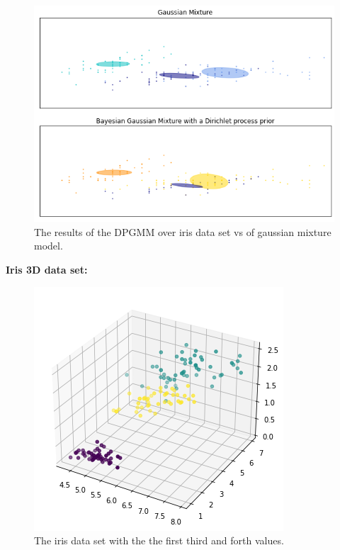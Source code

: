 \documentclass[12pt, a4paper]{paper}
\begin{document}
\begin{figure}[h!]
\centering
\includegraphics[scale=0.6]{iris_DPGMM_init.png}
\caption{The results of the DPGMM over iris data set vs of gaussian mixture model.}
\label{fig:Circular_3}
\end{figure}

\newpage

\textbf{Iris 3D data set:}

\begin{figure}[h!]
\centering
\includegraphics[scale=0.4]{iris_3D_DPGMM.png}
\caption{The iris data set with the the first third and forth values.}
\label{fig:Circular_3}
\end{figure}
\end{document}
